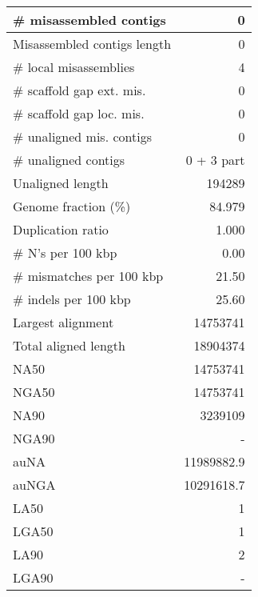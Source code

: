 \documentclass[12pt,a4paper]{article}
\begin{document}
\begin{table}[ht]
\begin{center}
\begin{tabular}{|l*{1}{|r}|}
\# misassembled contigs & 0 \\ \hline
Misassembled contigs length & 0 \\ \hline
\# local misassemblies & 4 \\ \hline
\# scaffold gap ext. mis. & 0 \\ \hline
\# scaffold gap loc. mis. & 0 \\ \hline
\# unaligned mis. contigs & 0 \\ \hline
\# unaligned contigs & 0 + 3 part \\ \hline
Unaligned length & 194289 \\ \hline
Genome fraction (\%) & 84.979 \\ \hline
Duplication ratio & 1.000 \\ \hline
\# N's per 100 kbp & 0.00 \\ \hline
\# mismatches per 100 kbp & 21.50 \\ \hline
\# indels per 100 kbp & 25.60 \\ \hline
Largest alignment & 14753741 \\ \hline
Total aligned length & 18904374 \\ \hline
NA50 & 14753741 \\ \hline
NGA50 & 14753741 \\ \hline
NA90 & 3239109 \\ \hline
NGA90 & - \\ \hline
auNA & 11989882.9 \\ \hline
auNGA & 10291618.7 \\ \hline
LA50 & 1 \\ \hline
LGA50 & 1 \\ \hline
LA90 & 2 \\ \hline
LGA90 & - \\ \hline
\end{tabular}
\end{center}
\end{table}
\end{document}
